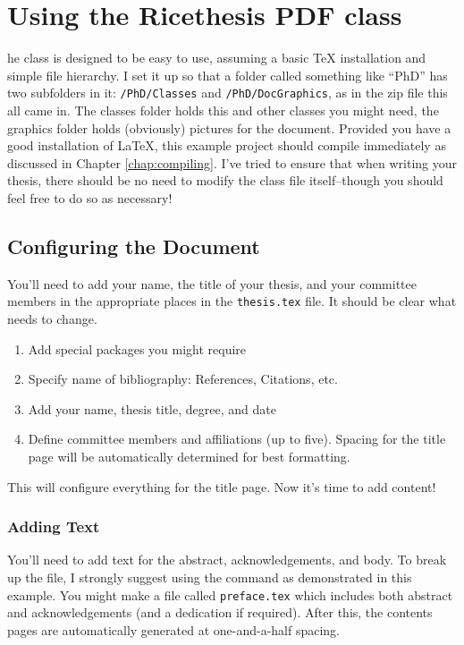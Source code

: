 \chapter{Using the Ricethesis PDF class}

he class is designed to be easy to use, assuming a basic TeX installation and simple file hierarchy.  I set it up so that a folder called something like ``PhD'' has two subfolders in it: \verb+/PhD/Classes+ and \verb+/PhD/DocGraphics+, as in the zip file this all came in.  The classes folder holds this and other classes you might need, the graphics folder holds (obviously) pictures for the document.  Provided you have a good installation of \LaTeX, this example project should compile immediately as discussed in Chapter \ref{chap:compiling}.  I've tried to ensure that when writing your thesis, there should be no need to modify the class file itself--though you should feel free to do so as necessary!

\section{Configuring the Document}

You'll need to add your name, the title of your thesis, and your committee members in the appropriate places in the \verb+thesis.tex+ file.  It should be clear what needs to change.

\begin{enumerate}
	\item Add special packages you might require
	\item Specify name of bibliography: References, Citations, etc.
	\item Add your name, thesis title, degree, and date
	\item Define committee members and affiliations (up to five).  Spacing for the title page will be automatically determined for best formatting.
\end{enumerate}

This will configure everything for the title page.  Now it's time to add content!

\subsection{Adding Text}

You'll need to add text for the abstract, acknowledgements, and body.  To break up the file, I strongly suggest using the \verb++ command as demonstrated in this example.  You might make a file called \verb+preface.tex+ which includes both abstract and acknowledgements (and a dedication if required).  After this, the contents pages are automatically generated at one-and-a-half spacing.

